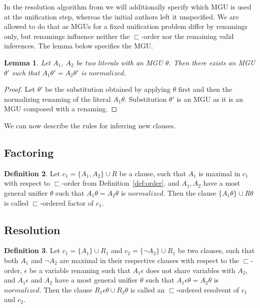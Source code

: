 \documentclass[english, shortabstract]{iithesis}
\theoremstyle{definition} \newtheorem{definition}{Definition}[chapter]
\theoremstyle{remark} \newtheorem{remark}[definition]{Observation}
\theoremstyle{plain} \newtheorem{theorem}[definition]{Theorem}
\theoremstyle{plain} \newtheorem{lemma}[definition]{Lemma}
\begin{document}
In the resolution algorithm from \cite{nivelle} we will additionally specify which MGU is used at the unification step,
whereas the initial authors left it unspecified.
We are allowed to do that as MGUs for a fixed unification problem differ by renamings only,
but renamings influence neither the $\sqsubset$-order nor the remaining valid inferences.
The lemma below specifies the MGU.
\begin{lemma}
Let $A_1$, $A_2$ be two literals with an MGU $\theta$.
Then there exists an MGU $\theta'$ such that $A_1\theta'=A_2\theta'$ is $normalized$.
\end{lemma}
\begin{proof}
Let $\theta'$ be the substitution obtained by applying $\theta$ first and then the normalizing renaming of the literal $A_1\theta$.
Substitution $\theta'$ is an MGU as it is an MGU composed with a renaming.
\end{proof}

We can now describe the rules for inferring new clauses.

\subsection{Factoring}

\begin{definition}\label{def:factoring}
Let $c_1=\{A_1, A_2\} \cup R$ be a clause,
such that $A_1$ is maximal in $c_1$ with respect to $\sqsubset$-order from Definition~\ref{def:order}.
and $A_1, A_2$ have a most general unifier $\theta$ such that $A_1\theta=A_2\theta$ is $normalized$.
Then the clause $\{A_1\theta\}\cup R\theta$ is called $\sqsubset$-ordered factor of $c_1$.
\end{definition}

\subsection{Resolution}

\begin{definition}\label{def:resolution}
Let $c_1=\{A_1\} \cup R_1$ and $c_2=\{\lnot A_2\} \cup R_1$ be two clauses,
such that both $A_1$ and $\lnot A_2$ are maximal in their respective clauses with respect to the $\sqsubset$-order,
$\epsilon$ be a variable renaming such that $A_1\epsilon$ does not share variables with $A_2$,
and $A_1\epsilon$ and $A_2$ have a most general unifier $\theta$ such that $A_1\epsilon\theta=A_2\theta$ is $normalized$.
Then the clause $R_1\epsilon\theta \cup R_2\theta$ is called an $\sqsubset$-ordered resolvent of $c_1$ and $c_2$.
\end{definition}
\end{document}
